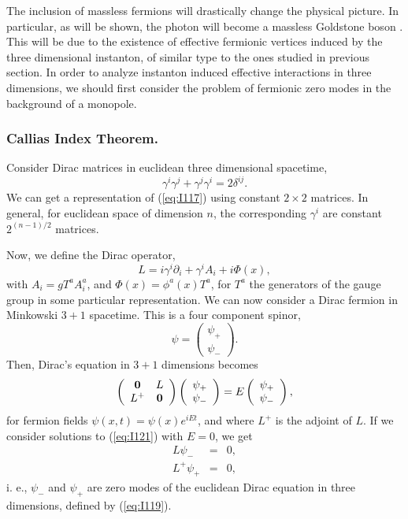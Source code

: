 The inclusion of massless fermions will drastically change the
physical picture. In particular, as will be shown, the photon
will become a massless Goldstone boson \cite{AHW}. This will be due to the
existence of effective fermionic vertices induced by the three
dimensional instanton, of similar type to the ones studied in
previous section. In order to analyze instanton induced effective
interactions in three dimensions, we should first consider the
problem of fermionic zero modes in the background of a monopole.


\subsubsection{Callias Index Theorem.}

Consider Dirac matrices in euclidean three
dimensional spacetime,
\begin{equation}
\gamma^{i} \gamma^{j}+ \gamma^{j} \gamma^{i} = 2 \delta^{ij}.
\label{eq:I117}
\end{equation}
We can get a representation of (\ref{eq:I117}) using constant
$2\times 2$ matrices. In general, for euclidean space of dimension $n$, the
corresponding $\gamma^{i}$ are constant $2^{(n-1)/2}$ matrices.
  
Now, we define the Dirac operator,
\begin{equation}
L= i \gamma^{i}\partial_i + \gamma^{i} A_i + i \Phi(x),
\label{eq:I119}
\end{equation}
with $A_i = g T^{a} A_i^{a}$, and $\Phi(x) = \phi^{a}(x) T^{a}$, 
for $T^{a}$ the generators of the gauge group in some particular representation. We can 
now consider a Dirac fermion in Minkowski $3+1$ spacetime. This is a four component 
spinor,
\begin{equation}
\psi =  \left( \begin{array}{c} \psi_+ \\ \psi_- \end{array} \right).
\label{eq:I120}
\end{equation}
Then, Dirac's equation in $3+1$ dimensions becomes
\begin{equation}
\left( \begin{array}{cc} {\bf 0} & L \\
			 L^+     & {\bf 0}  \end{array} \right) 
		\left( \begin{array}{c} \psi_+ \\ \psi_- \end{array} \right) 
		= E \left( \begin{array}{c} \psi_+ \\ \psi_- \end{array} 
		\right),
\label{eq:I121}
\end{equation}
for fermion fields $\psi(x,t)=\psi(x) e^{iEt}$, and where $L^+$ is the adjoint of $L$. If we consider
solutions to (\ref{eq:I121}) with $E=0$, we get
\begin{eqnarray}
  L \psi_- & = & 0, \nonumber \\
L^+ \psi_+ & = & 0,
\label{eq:I122}
\end{eqnarray}
i. e., $\psi_-$ and $\psi_+$ are zero modes of the euclidean
Dirac equation in three dimensions, defined by (\ref{eq:I119}).
  
